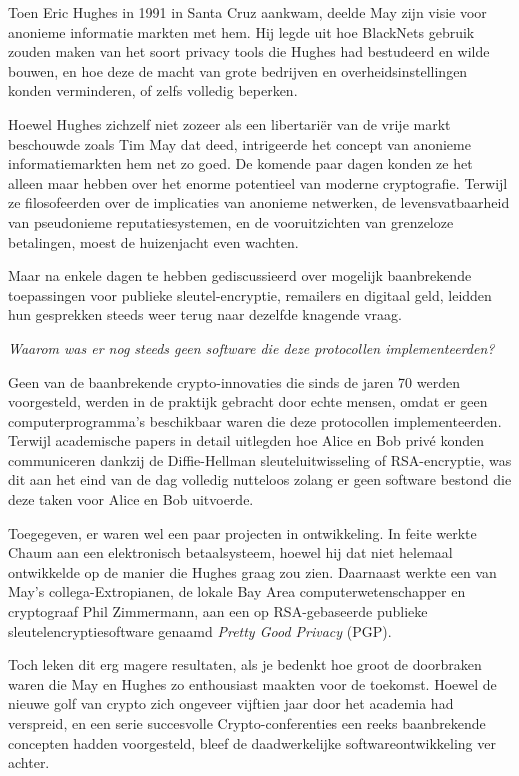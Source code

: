 \documentclass[smalldemyvopaper,11pt,twoside,onecolumn,openright,extrafontsizes,hidelinks]{memoir}
\begin{document}
Toen Eric Hughes in 1991 in Santa Cruz aankwam, deelde May zijn visie
voor anonieme informatie markten met hem. Hij legde uit hoe BlackNets
gebruik zouden maken van het soort privacy tools die Hughes had
bestudeerd en wilde bouwen, en hoe deze de macht van grote bedrijven en
overheidsinstellingen konden verminderen, of zelfs volledig beperken.

Hoewel Hughes zichzelf niet zozeer als een libertariër van de vrije
markt beschouwde zoals Tim May dat deed, intrigeerde het concept van
anonieme informatiemarkten hem net zo goed. De komende paar dagen konden
ze het alleen maar hebben over het enorme potentieel van moderne
cryptografie. Terwijl ze filosofeerden over de implicaties van anonieme
netwerken, de levensvatbaarheid van pseudonieme reputatiesystemen, en de
vooruitzichten van grenzeloze betalingen, moest de huizenjacht even
wachten.

Maar na enkele dagen te hebben gediscussieerd over mogelijk baanbrekende
toepassingen voor publieke sleutel-encryptie, remailers en digitaal
geld, leidden hun gesprekken steeds weer terug naar dezelfde knagende
vraag.

\emph{Waarom was er nog steeds geen software die deze protocollen
implementeerden?}

Geen van de baanbrekende crypto-innovaties die sinds de jaren 70 werden
voorgesteld, werden in de praktijk gebracht door echte mensen, omdat er
geen computerprogramma's beschikbaar waren die deze protocollen
implementeerden. Terwijl academische papers in detail uitlegden hoe
Alice en Bob privé konden communiceren dankzij de Diffie-Hellman
sleuteluitwisseling of RSA-encryptie, was dit aan het eind van de dag
volledig nutteloos zolang er geen software bestond die deze taken voor
Alice en Bob uitvoerde.

Toegegeven, er waren wel een paar projecten in ontwikkeling. In feite
werkte Chaum aan een elektronisch betaalsysteem, hoewel hij dat niet
helemaal ontwikkelde op de manier die Hughes graag zou zien. Daarnaast
werkte een van May's collega-Extropianen, de lokale Bay Area
computerwetenschapper en cryptograaf Phil Zimmermann, aan een op
RSA-gebaseerde publieke sleutelencryptiesoftware genaamd \emph{Pretty
Good Privacy} (PGP).

Toch leken dit erg magere resultaten, als je bedenkt hoe groot de
doorbraken waren die May en Hughes zo enthousiast maakten voor de
toekomst. Hoewel de nieuwe golf van crypto zich ongeveer vijftien jaar
door het academia had verspreid, en een serie succesvolle
Crypto-conferenties een reeks baanbrekende concepten hadden voorgesteld,
bleef de daadwerkelijke softwareontwikkeling ver achter.
\end{document}

